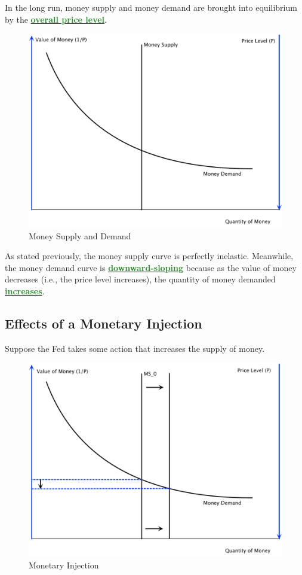 \documentclass[11pt]{article}\usepackage[]{graphicx}\usepackage[]{color}
\theoremstyle{definition}
\newcommand{\dd}[1]{{\underline{\textbf{\textcolor{ForestGreen}{#1}}}}}
\begin{document}
In the long run, money supply and money demand are brought into equilibrium by the \dd{overall price level}.

	\begin{figure}[H]
		\centering
		\includegraphics[scale=.40]{plot93.pdf}
		\caption{Money Supply and Demand}
	\end{figure}
	

As stated previously, the money supply curve is perfectly inelastic. Meanwhile, the money demand curve is \dd{downward-sloping} because as the value of money decreases (i.e., the price level increases), the quantity of money demanded \dd{increases}.

\subsection{Effects of a Monetary Injection}

Suppose the Fed takes some action that increases the supply of money. 

	\begin{figure}[H]
		\centering
		\includegraphics[scale=.40]{plot94.pdf}
		\caption{Monetary Injection}
	\end{figure}
\end{document}
